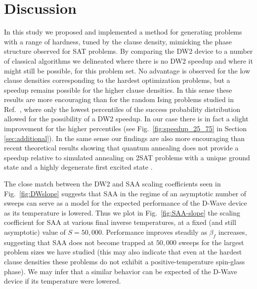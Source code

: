 \section{Discussion}
\label{sec:conclusions}
In this study we proposed and implemented a method for generating problems with a range of hardness, tuned by the clause density, mimicking the phase structure observed for SAT problems.
By comparing the DW2 device to a number of classical algorithms we delineated where there is no DW2 speedup and where it might still be possible, for this problem set. No advantage is observed for the low clause densities corresponding to the hardest optimization problems, but a speedup remains possible for the higher clause densities. In this sense these results are more encouraging than for the random Ising problems studied in Ref.~\cite{speedup}, where only the lowest percentiles of the success probability distribution allowed for the possibility of a DW2 speedup. In our case there is in fact a slight improvement for the higher percentiles (see Fig.~\ref{fig:speedup_25_75} in Section \ref{sec:additional}).
In the same sense our findings are also more encouraging than recent theoretical results showing that quantum annealing does not provide a speedup relative to simulated annealing on 2SAT problems with a unique ground state and a highly degenerate first excited state \cite{Neuhaus:2014mz}.

The close match between the DW2 and SAA scaling coefficients seen in Fig.~\ref{fig:DWslope} suggests that SAA in the regime of an asymptotic number of sweeps can serve as a model for the expected performance of the D-Wave device as its temperature is lowered. Thus we plot in Fig.~\ref{fig:SAA-slope} the scaling coefficient for SAA at various final inverse temperatures, at a fixed (and still asymptotic) value of $S=50,\!000$. Performance improves steadily as $\beta_f$ increases, suggesting that SAA does not become trapped at $50,\!000$ sweeps for the largest problem sizes we have studied (this may also indicate that even at the hardest clause densities these problems do not exhibit a positive-temperature spin-glass phase).
We may infer that a similar behavior can be expected of the D-Wave device if its temperature were lowered.

